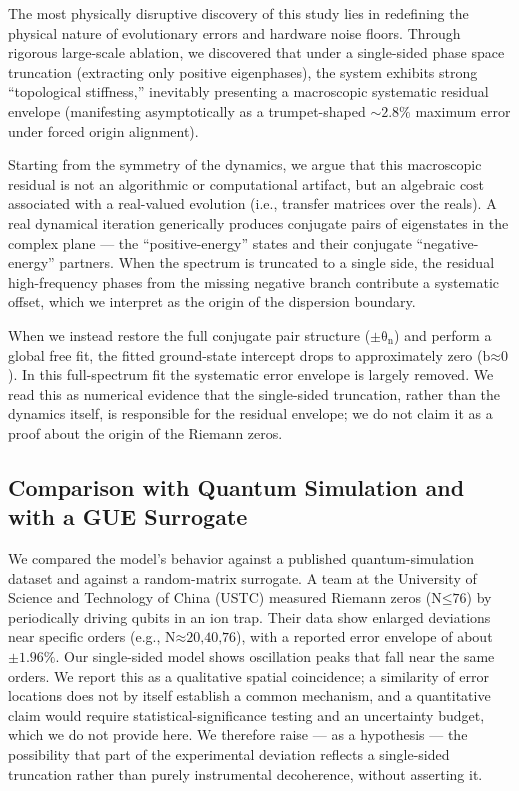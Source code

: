 The most physically disruptive discovery of this study lies in
redefining the physical nature of evolutionary errors and hardware noise
floors. Through rigorous large-scale ablation, we discovered that under
a single-sided phase space truncation (extracting only positive
eigenphases), the system exhibits strong ``topological stiffness,''
inevitably presenting a macroscopic systematic residual envelope
(manifesting asymptotically as a trumpet-shaped \(\text{∼2.8\%}\)
maximum error under forced origin alignment).

Starting from the symmetry of the dynamics, we argue that
this macroscopic residual is not an algorithmic or computational
artifact, but an algebraic cost associated with a real-valued
evolution (i.e., transfer matrices over the reals). A real
dynamical iteration generically produces conjugate pairs of
eigenstates in the complex plane --- the ``positive-energy'' states and
their conjugate ``negative-energy'' partners. When the spectrum is
truncated to a single side, the residual high-frequency phases from the
missing negative branch contribute a systematic offset, which we
interpret as the origin of the dispersion boundary.

When we instead restore the full conjugate pair structure
(\(\text{±}\text{θ}_{\text{n}}\)) and perform a global free fit, the
fitted ground-state intercept drops to approximately zero
(\(\text{b}\text{≈0}\)). In this full-spectrum fit the systematic error
envelope is largely removed. We read this as numerical evidence that the
single-sided truncation, rather than the dynamics itself, is responsible
for the residual envelope; we do not claim it as a proof about the origin
of the Riemann zeros.

\subsection*{Comparison with Quantum Simulation and with a GUE Surrogate}

We compared the model's behavior against a published quantum-simulation
dataset and against a random-matrix surrogate. A team at the University
of Science and Technology of China (USTC) measured Riemann zeros
(\(\text{N}\text{≤76}\)) by periodically driving qubits in an ion trap.
Their data show enlarged deviations near specific orders (e.g.,
\(\text{N}\text{≈20,40,76}\)), with a reported error envelope of about
\(\text{±1.96\%}\). Our single-sided model shows oscillation peaks that
fall near the same orders. We report this as a qualitative spatial
coincidence; a similarity of error locations does not by itself
establish a common mechanism, and a quantitative claim would require
statistical-significance testing and an uncertainty budget, which we do
not provide here. We therefore raise --- as a hypothesis --- the
possibility that part of the experimental deviation reflects a
single-sided truncation rather than purely instrumental decoherence,
without asserting it.

